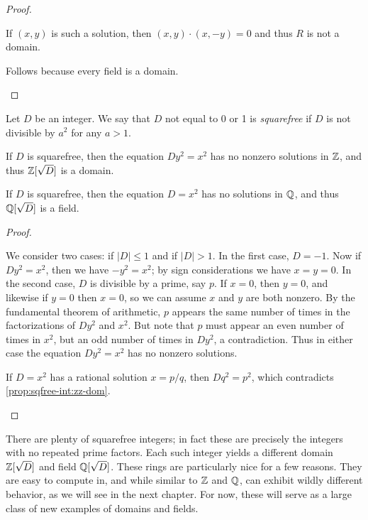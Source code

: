\begin{proof}
\begin{inlineproplist}
\item If \((x,y)\) is such a solution, then \((x,y) \cdot (x,-y) = 0\) and thus \(R\) is not a domain.
\item Follows because every field is a domain.
\end{inlineproplist}
\end{proof}

\begin{prop} \label{prop:sqfree-int}
Let \(D\) be an integer.
We say that \(D\) not equal to 0 or 1 is \emph{squarefree} if \(D\) is not divisible by \(a^2\) for any \(a > 1\).
\begin{proplist}
\item \label{prop:sqfree-int:zz-dom} If \(D\) is squarefree, then the equation \(Dy^2 = x^2\) has no nonzero solutions in \(\mathbb{Z}\), and thus \(\mathbb{Z}[\sqrt{D}]\) is a domain.
\item \label{prop:sqfree-int:qq-field} If \(D\) is squarefree, then the equation \(D = x^2\) has no solutions in \(\mathbb{Q}\), and thus \(\mathbb{Q}[\sqrt{D}]\) is a field.
\end{proplist}
\end{prop}

\begin{proof}
\begin{inlineproplist}
\item We consider two cases: if \(|D| \leq 1\) and if \(|D| > 1\).
In the first case, \(D = -1\).
Now if \(Dy^2 = x^2\), then we have \(-y^2 = x^2\); by sign considerations we have \(x = y = 0\).
In the second case, \(D\) is divisible by a prime, say \(p\).
If \(x = 0\), then \(y = 0\), and likewise if \(y = 0\) then \(x = 0\), so we can assume \(x\) and \(y\) are both nonzero.
By the fundamental theorem of arithmetic, \(p\) appears the same number of times in the factorizations of \(Dy^2\) and \(x^2\).
But note that \(p\) must appear an even number of times in \(x^2\), but an odd number of times in \(Dy^2\), a contradiction.
Thus in either case the equation \(Dy^2 = x^2\) has no nonzero solutions.
\item If \(D = x^2\) has a rational solution \(x = p/q\), then \(Dq^2 = p^2\), which contradicts \ref{prop:sqfree-int:zz-dom}.
\end{inlineproplist}
\end{proof}

There are plenty of squarefree integers; in fact these are precisely the integers with no repeated prime factors.
Each such integer yields a different domain \(\mathbb{Z}[\sqrt{D}]\) and field \(\mathbb{Q}[\sqrt{D}]\).
These rings are particularly nice for a few reasons.
They are easy to compute in, and while similar to \(\mathbb{Z}\) and \(\mathbb{Q}\), can exhibit wildly different behavior, as we will see in the next chapter.
For now, these will serve as a large class of new examples of domains and fields.



